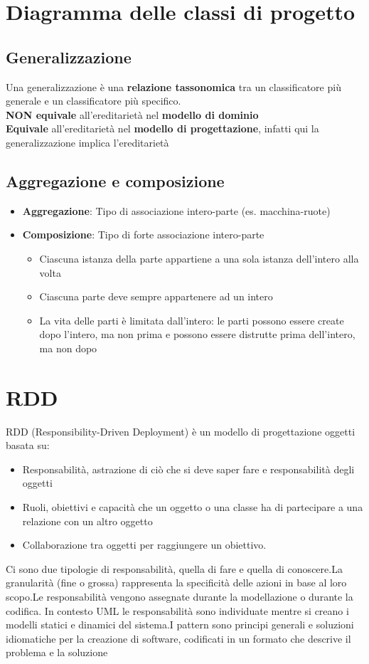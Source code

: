 \documentclass[12pt]{article}
\begin{document}
\section{Diagramma delle classi di progetto}
\subsection{Generalizzazione}
Una generalizzazione è una \textbf{relazione tassonomica} tra un classificatore più generale e un classificatore più specifico. 
\\\textbf{NON equivale} all'ereditarietà nel \textbf{modello di dominio}
\\\textbf{Equivale} all'ereditarietà nel \textbf{modello di progettazione}, infatti qui la generalizzazione implica l'ereditarietà

\subsection{Aggregazione e composizione}
\begin{itemize}
    \item \textbf{Aggregazione}: Tipo di associazione intero-parte (es. macchina-ruote)
    \item \textbf{Composizione}: Tipo di forte associazione intero-parte
    \begin{itemize}
        \item Ciascuna istanza della parte appartiene a una sola istanza dell'intero alla volta
        \item Ciascuna parte deve sempre appartenere ad un intero
        \item La vita delle parti è limitata dall'intero: le parti possono essere create dopo l'intero, ma non prima e possono essere distrutte prima dell'intero, ma non dopo
    \end{itemize}
\end{itemize}
\section{RDD}
RDD (Responsibility-Driven Deployment) è un modello di progettazione oggetti basata su:
\begin{itemize}
    \item Responsabilità, astrazione di ciò che si deve saper fare e responsabilità degli oggetti
    \item Ruoli, obiettivi e capacità che un oggetto o una classe ha di partecipare a una relazione con un altro oggetto
    \item Collaborazione tra oggetti per raggiungere un obiettivo.
\end{itemize}
Ci sono due tipologie di responsabilità, quella di fare e quella di conoscere.La granularità (fine o grossa) rappresenta la specificità delle azioni in base al loro scopo.Le responsabilità vengono assegnate durante la modellazione o durante la codifica. In contesto UML le responsabilità sono individuate mentre si creano i modelli statici e dinamici del sistema.I pattern sono principi generali e soluzioni idiomatiche per la creazione di software, codificati in un formato che descrive il problema e la soluzione
\end{document}
